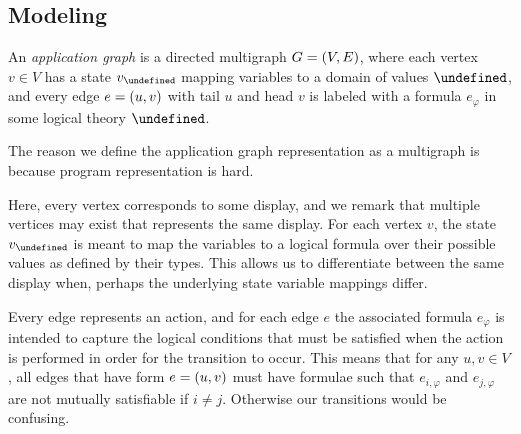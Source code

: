 \documentclass[12pt]{article}
\let\state\undefined
\newcommand{\state}{\ensuremath{\sigma}}
\let\domval\undefined
\newcommand{\domval}{\ensuremath{\mathcal{A}}}
\newcommand{\form}{\ensuremath{\varphi}}
\let\domform\undefined
\newcommand{\domform}{\ensuremath{\mathcal{F}}}
\begin{document}
\subsection{Modeling}
\begin{definition}
An \textit{application graph} is a directed multigraph $G = {\left(V, E\right)}$,
where each vertex $v \in V$ has a state $v_{\state}$ mapping
variables to a domain of values $\domval$,
and every edge $e = {\left(u, v\right)}$ with tail $u$ and head $v$ is labeled
with a formula $e_{\form}$ in some logical theory $\domform$.
\end{definition}

The reason we define the application graph representation as a multigraph
is because program representation is hard.

Here, every vertex corresponds to some display, and we remark
that multiple vertices may exist that represents the same display.
For each vertex $v$, the state $v_{\state}$ is meant to map the variables
to a logical formula over their possible values as defined by their types.
This allows us to differentiate between the same display when, perhaps
the underlying state variable mappings differ.

Every edge represents an action, and for each edge $e$
the associated formula $e_{\form}$ is intended to capture the logical
conditions that must be satisfied when the action is performed in order
for the transition to occur.
This means that for any $u, v \in V$, all edges that have form
$e = {\left(u, v\right)}$ must have formulae such that
$e_{i, \varphi}$ and $e_{j, \varphi}$ are not mutually satisfiable if
$i \neq j$.
Otherwise our transitions would be confusing.
\end{document}
